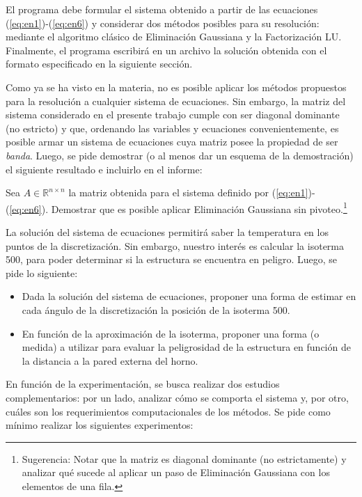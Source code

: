 \begin{appendices}
      El programa debe formular el sistema obtenido a partir de las ecuaciones (\ref{eq:en1})-(\ref{eq:en6}) y considerar dos métodos posibles para su resolución: mediante el algoritmo clásico de Eliminación Gaussiana y la Factorización LU. Finalmente, el programa escribirá en un archivo la solución obtenida con el formato especificado en la siguiente sección.

      Como ya se ha visto en la materia, no es posible aplicar los métodos propuestos para la resolución a cualquier sistema de ecuaciones. Sin embargo, la matriz del sistema considerado en el presente trabajo cumple con ser diagonal dominante (no estricto) y que, ordenando las variables y ecuaciones convenientemente, es posible armar un sistema de ecuaciones cuya matriz posee la propiedad de ser \emph{banda}. Luego, se pide demostrar (o al menos dar un esquema de la demostración) el siguiente resultado e incluirlo en el informe:

      \begin{prop}
        Sea $A \in \mathbb{R}^{n \times n}$ la matriz obtenida para el sistema definido por (\ref{eq:en1})-(\ref{eq:en6}). Demostrar que es posible aplicar Eliminación Gaussiana sin pivoteo.\footnote{Sugerencia: Notar que la matriz es diagonal dominante (no estrictamente) y analizar qué sucede al aplicar un paso de Eliminación Gaussiana con los elementos de una fila.}
      \end{prop}

      La solución del sistema de ecuaciones permitirá saber la temperatura en los puntos de la discretización. Sin embargo, nuestro interés es calcular la isoterma 500, para poder determinar si la estructura se encuentra en peligro. Luego, se pide lo siguiente:

      \begin{itemize}
        \item Dada la solución del sistema de ecuaciones, proponer una forma de estimar en cada ángulo de la discretización la posición de la isoterma 500.
        \item En función de la aproximación de la isoterma, proponer una forma (o medida) a utilizar para evaluar la peligrosidad de la estructura en función de la distancia a la pared externa del horno.
      \end{itemize}

      En función de la experimentación, se busca realizar dos estudios complementarios: por un lado, analizar cómo se comporta el sistema y, por otro, cuáles son los requerimientos computacionales de los métodos. Se pide como mínimo realizar los siguientes experimentos:


\end{appendices}
